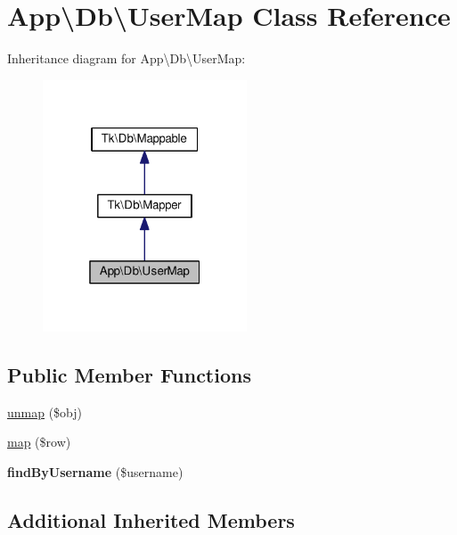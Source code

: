 \hypertarget{classApp_1_1Db_1_1UserMap}{\section{App\textbackslash{}Db\textbackslash{}User\+Map Class Reference}
\label{classApp_1_1Db_1_1UserMap}
}


Inheritance diagram for App\textbackslash{}Db\textbackslash{}User\+Map\+:\nopagebreak
\begin{figure}[H]
\begin{center}
\leavevmode
\includegraphics[width=172pt]{classApp_1_1Db_1_1UserMap__inherit__graph}
\end{center}
\end{figure}
\subsection*{Public Member Functions}
\begin{DoxyCompactItemize}
\item 
\hyperlink{classApp_1_1Db_1_1UserMap_a581307e8d72d0af72967e4dcd135ec6c}{unmap} (\$obj)
\item 
\hyperlink{classApp_1_1Db_1_1UserMap_a403e564556119782400d9b56958895be}{map} (\$row)
\item 
\hypertarget{classApp_1_1Db_1_1UserMap_a46cc08280bf8a858354abfe499801172}{{\bfseries find\+By\+Username} (\$username)}\label{classApp_1_1Db_1_1UserMap_a46cc08280bf8a858354abfe499801172}

\end{DoxyCompactItemize}
\subsection*{Additional Inherited Members}


